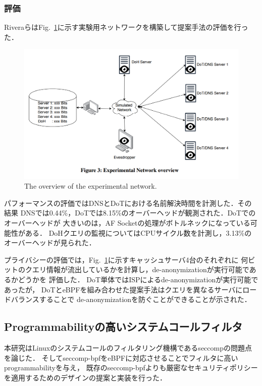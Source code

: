 \documentclass[platex,a4j,10pt,twoside,twocolumn,dvipdfmx]{jsarticle}
\newcommand{\Fref}[1]{Fig.~\ref{#1}}
\begin{document}
\subsubsection{評価}
Riveraらは\Fref{img:dns-net}に示す実験用ネットワークを構築して提案手法の評価を行った．
\begin{figure}[tp]
  \begin{center}
    \includegraphics[width=\columnwidth]{./img/dns-eval-net.png}
  \end{center}
  \caption{The overview of the experimental network.}
  \label{img:dns-net}
\end{figure}

パフォーマンスの評価ではDNSとDoTにおける名前解決時間を計測した．その結果
DNSでは0.44\%，DoTでは8.15\%のオーバーヘッドが観測された．DoTでのオーバーヘッドが
大きいのは，AF Socketの処理がボトルネックになっている可能性がある．
DoHクエリの監視についてはCPUサイクル数を計測し，3.13\%のオーバーヘッドが見られた．

プライバシーの評価では，\Fref{img:dns-net}に示すキャッシュサーバ4台のそれぞれに
何ビットのクエリ情報が流出しているかを計算し，de-anonymizationが実行可能であるかどうかを
評価した．
DoT単体ではISPによるde-anonymizationが実行可能であったが，
DoTとeBPFを組み合わせた提案手法はクエリを異なるサーバにロードバランスすることで
de-anonymizationを防ぐことができることが示された．

\subsection{Programmabilityの高いシステムコールフィルタ \cite{jia2023programmable}}
本研究はLinuxのシステムコールのフィルタリング機構であるseccompの問題点を論じた．
そしてseccomp-bpfをeBPFに対応させることでフィルタに高いprogrammabilityを与え，
既存のseccomp-bpfよりも厳密なセキュリティポリシーを適用するためのデザインの提案と実装を行った．
\end{document}
